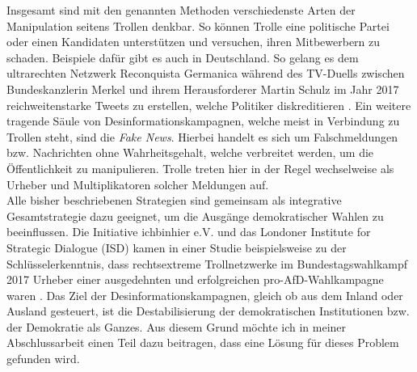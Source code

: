 Insgesamt sind mit den genannten Methoden verschiedenste Arten der Manipulation seitens Trollen denkbar. So können Trolle eine politische Partei oder einen Kandidaten unterstützen und versuchen, ihren Mitbewerbern zu schaden. Beispiele dafür gibt es auch in Deutschland.
So gelang es dem ultrarechten Netzwerk \glqq Reconquista Germanica\grqq{} während des TV-Duells zwischen Bundeskanzlerin Merkel und ihrem Herausforderer Martin Schulz im Jahr 2017 reichweitenstarke Tweets zu erstellen, welche Politiker diskreditieren \citep{tagesschau2020}.
Ein weitere tragende Säule von Desinformationskampagnen, welche meist in Verbindung zu Trollen steht, sind die \textit{Fake News}. Hierbei handelt es sich um Falschmeldungen bzw. Nachrichten ohne Wahrheitsgehalt, welche verbreitet werden, um die Öffentlichkeit zu manipulieren. Trolle treten hier in der Regel wechselweise als Urheber und Multiplikatoren solcher Meldungen auf.\\
Alle bisher beschriebenen Strategien sind gemeinsam als integrative Gesamtstrategie dazu geeignet, um die Ausgänge demokratischer Wahlen zu beeinflussen. Die Initiative \glqq ichbinhier e.V.\grqq{} und das Londoner \glqq Institute for Strategic Dialogue\grqq{} (ISD) kamen in einer Studie beispielsweise zu der Schlüsselerkenntnis, dass rechtsextreme Trollnetzwerke im Bundestagswahlkampf 2017 Urheber einer ausgedehnten und erfolgreichen \glqq pro-AfD-Wahlkampagne\grqq{} waren \citep{ISD18}. Das Ziel der Desinformationskampagnen, gleich ob aus dem Inland oder Ausland gesteuert, ist die Destabilisierung der demokratischen Institutionen bzw. der Demokratie als Ganzes. Aus diesem Grund möchte ich in meiner Abschlussarbeit einen Teil dazu beitragen, dass eine Lösung für dieses Problem gefunden wird.  
